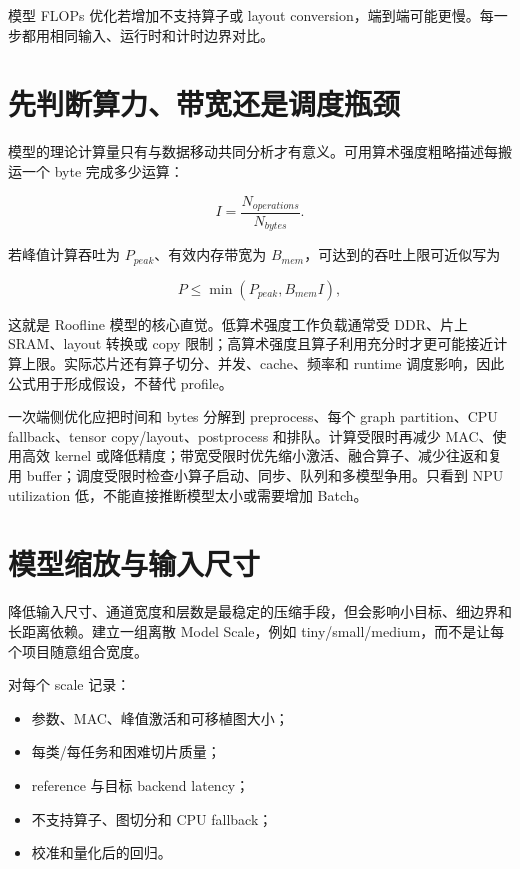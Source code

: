 模型 FLOPs 优化若增加不支持算子或 layout conversion，端到端可能更慢。每一步都用相同输入、运行时和计时边界对比。

\section{先判断算力、带宽还是调度瓶颈}

模型的理论计算量只有与数据移动共同分析才有意义。可用算术强度粗略描述每搬运一个 byte 完成多少运算：

\begin{equation}
  I=\frac{N_{operations}}{N_{bytes}}.
\end{equation}

若峰值计算吞吐为 $P_{peak}$、有效内存带宽为 $B_{mem}$，可达到的吞吐上限可近似写为

\begin{equation}
  P\leq\min(P_{peak},B_{mem}I),
\end{equation}

这就是 Roofline 模型的核心直觉\cite{roofline-model}。低算术强度工作负载通常受 DDR、片上 SRAM、layout 转换或 copy 限制；高算术强度且算子利用充分时才更可能接近计算上限。实际芯片还有算子切分、并发、cache、频率和 runtime 调度影响，因此公式用于形成假设，不替代 profile。

一次端侧优化应把时间和 bytes 分解到 preprocess、每个 graph partition、CPU fallback、tensor copy/layout、postprocess 和排队。计算受限时再减少 MAC、使用高效 kernel 或降低精度；带宽受限时优先缩小激活、融合算子、减少往返和复用 buffer；调度受限时检查小算子启动、同步、队列和多模型争用。只看到 NPU utilization 低，不能直接推断模型太小或需要增加 Batch。

\section{模型缩放与输入尺寸}

降低输入尺寸、通道宽度和层数是最稳定的压缩手段，但会影响小目标、细边界和长距离依赖。建立一组离散 Model Scale，例如 tiny/small/medium，而不是让每个项目随意组合宽度。

对每个 scale 记录：

\begin{itemize}
  \item 参数、MAC、峰值激活和可移植图大小；
  \item 每类/每任务和困难切片质量；
  \item reference 与目标 backend latency；
  \item 不支持算子、图切分和 CPU fallback；
  \item 校准和量化后的回归。
\end{itemize}

